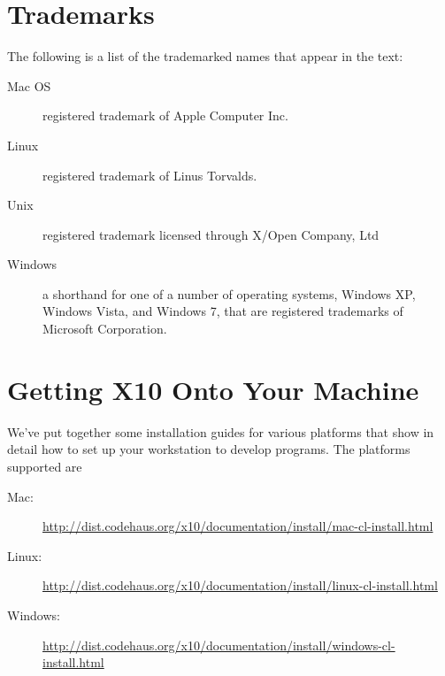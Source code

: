 
\section*{Trademarks}
The following is a list of the trademarked names that appear in the text:
\begin{description}
\item[Mac OS] registered trademark of Apple Computer Inc.
\item[Linux]  registered trademark of Linus Torvalds.
\item[Unix] registered trademark licensed through X/Open Company, Ltd
\item[Windows] a shorthand for one of a number of operating systems,
Windows XP, Windows Vista, and Windows 7, that are registered trademarks of
Microsoft Corporation.
\end{description}

\section*{Getting X10 Onto Your Machine}

We've put together some installation guides for various platforms that show in
detail how to set up your workstation to develop \Xten{} programs. The
platforms supported are
\begin{description}
\item[Mac:]\href{http://dist.codehaus.org/x10/documentation/install/mac-cl-install.html} 
{http://dist.codehaus.org/x10/documentation/install/mac-cl-install.html}
\item[Linux:]\href{http://dist.codehaus.org/x10/documentation/install/linux-cl-install.html} 
{http://dist.codehaus.org/x10/documentation/install/linux-cl-install.html}
\item[Windows:]\href{http://dist.codehaus.org/x10/documentation/install/windows-cl-install.html}
{http://dist.codehaus.org/x10/documentation/install/windows-cl-install.html}
\end{description}

